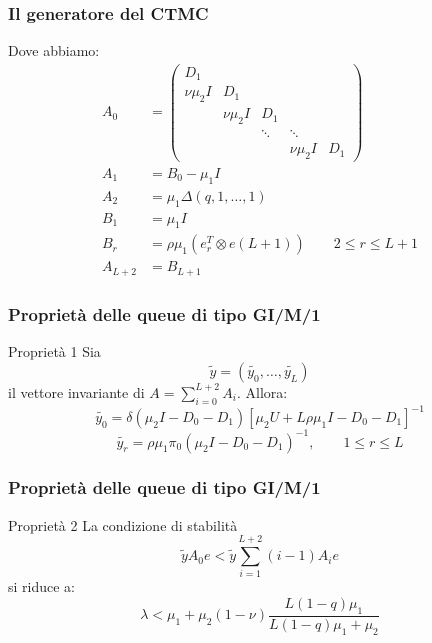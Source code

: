 \documentclass{beamer}
\begin{document}
\begin{frame}
    \frametitle{Il generatore del CTMC}
    Dove abbiamo:
    \begin{equation*}
        \begin{split}
            A_0 &=
            \begin{pmatrix}
                D_1 & & & & \\
                \nu\mu_2 I & D_1 & & & \\
                & \nu \mu_2 I & D_1 & & \\
                & & \ddots & \ddots & \\
                & & & \nu \mu_2 I & D_1
            \end{pmatrix} \\
            A_1 &= B_0 -\mu_1 I \\
            A_2 & = \mu_1 \Delta(q,1, \dots, 1) \\
            B_1 &= \mu_1 I \\
            B_r &= \rho \mu_1 (e_r^T \otimes e(L+1)) \qquad 2 \leq r \leq L+1 \\
            A_{L+2} &= B_{L+1}
        \end{split}
    \end{equation*}
\end{frame}


\begin{frame}
    \frametitle{Proprietà delle queue di tipo GI/M/1}
    \begin{block}{Proprietà 1}
        Sia
        $$\widetilde{y} = (\widetilde{y_0}, \dots, \widetilde{y_{L}})$$
        il vettore invariante di $\displaystyle A = \sum_{i=0}^{L+2} A_i$. Allora:
            $$ \widetilde{y_0} = \delta(\mu_2I - D_0 - D_1)[\mu_2U + L\rho\mu_1 I - D_0 - D_1]^{-1} $$
            $$ \widetilde{y_r} = \rho \mu_1 \pi_0(\mu_2I - D_0 - D_1)^{-1}, \qquad 1 \leq r \leq L $$
    \end{block}
\end{frame}


\begin{frame}
    \frametitle{Proprietà delle queue di tipo GI/M/1}
    \begin{block}{Proprietà 2}
        La condizione di stabilità
        $$ \widetilde{y} A_0 e < \widetilde{y} \sum_{i=1}^{L+2}(i-1)A_i e $$
        si riduce a:
        $$ \lambda < \mu_1 + \mu_2(1 - \nu) \frac{L(1-q)\mu_1}{L(1-q)\mu_1 + \mu_2}  $$
    \end{block}
\end{frame}
\end{document}
